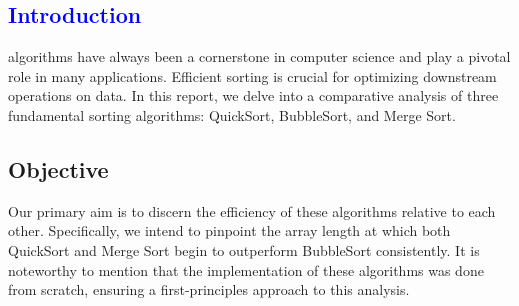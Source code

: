 

\textcolor{blue}{\section{Introduction}}

 algorithms have always been a cornerstone in computer science and play a pivotal role in many applications. Efficient sorting is crucial for optimizing downstream operations on data. In this report, we delve into a comparative analysis of three fundamental sorting algorithms: QuickSort, BubbleSort, and Merge Sort.

\subsection{Objective}
Our primary aim is to discern the efficiency of these algorithms relative to each other. Specifically, we intend to pinpoint the array length at which both QuickSort and Merge Sort begin to outperform BubbleSort consistently. It is noteworthy to mention that the implementation of these algorithms was done from scratch, ensuring a first-principles approach to this analysis.

